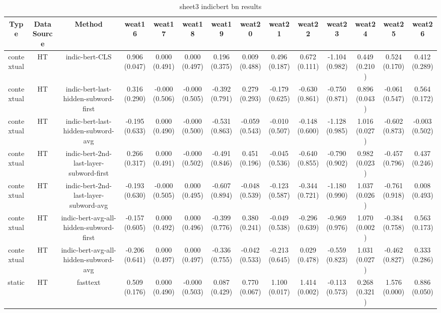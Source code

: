 \begin{sidewaystable}[htb]
    \centering
    \caption{sheet3 indicbert bn results}
    \label{appendix_tab:sheet3_indicbert_bn_results}
    \small
    \begin{tabular}{@{}cccccccccccccc@{}}
        \toprule
        Type & DataSource & Method & weat16 & weat17 & weat18 & weat19 & weat20 & weat21 & weat22 & weat23 & weat24 & weat25 & weat26 \\
        \midrule
        contextual & HT & indic-bert-CLS & 0.906 (0.047) & 0.000 (0.491) & 0.000 (0.497) & 0.196 (0.375) & 0.009 (0.488) & 0.496 (0.187) & 0.672 (0.111) & -1.104 (0.982) & 0.449 (0.210) & 0.524 (0.170) & 0.412 (0.289) \\
        contextual & HT & indic-bert-last-hidden-subword-first & 0.316 (0.290) & -0.000 (0.506) & -0.000 (0.505) & -0.392 (0.791) & 0.279 (0.293) & -0.179 (0.625) & -0.630 (0.861) & -0.750 (0.871) & 0.896 (0.043) & -0.061 (0.547) & 0.564 (0.172) \\
        contextual & HT & indic-bert-last-hidden-subword-avg & -0.195 (0.633) & 0.000 (0.490) & -0.000 (0.500) & -0.531 (0.863) & -0.059 (0.543) & -0.010 (0.507) & -0.148 (0.600) & -1.128 (0.985) & 1.016 (0.027) & -0.602 (0.873) & -0.003 (0.502) \\
        contextual & HT & indic-bert-2nd-last-layer-subword-first & 0.266 (0.317) & 0.000 (0.491) & -0.000 (0.502) & -0.491 (0.846) & 0.451 (0.196) & -0.045 (0.536) & -0.640 (0.855) & -0.790 (0.902) & 0.982 (0.023) & -0.457 (0.796) & 0.437 (0.246) \\
        contextual & HT & indic-bert-2nd-last-layer-subword-avg & -0.193 (0.630) & -0.000 (0.505) & 0.000 (0.495) & -0.607 (0.894) & -0.048 (0.539) & -0.123 (0.587) & -0.344 (0.721) & -1.180 (0.990) & 1.037 (0.026) & -0.761 (0.918) & 0.008 (0.493) \\
        contextual & HT & indic-bert-avg-all-hidden-subword-first & -0.157 (0.605) & 0.000 (0.492) & 0.000 (0.496) & -0.399 (0.776) & 0.380 (0.241) & -0.049 (0.538) & -0.296 (0.639) & -0.969 (0.976) & 1.070 (0.002) & -0.384 (0.758) & 0.563 (0.173) \\
        contextual & HT & indic-bert-avg-all-hidden-subword-avg & -0.206 (0.641) & 0.000 (0.497) & 0.000 (0.497) & -0.336 (0.755) & -0.042 (0.533) & -0.213 (0.645) & 0.029 (0.478) & -0.559 (0.823) & 1.031 (0.027) & -0.462 (0.827) & 0.333 (0.286) \\
        static & HT & fasttext & 0.509 (0.176) & 0.000 (0.490) & -0.000 (0.503) & 0.087 (0.429) & 0.770 (0.067) & 1.100 (0.017) & 1.414 (0.002) & -0.113 (0.573) & 0.268 (0.321) & 1.576 (0.000) & 0.886 (0.050) \\

\end{tabular}
\end{sidewaystable}
